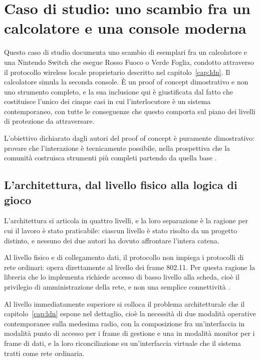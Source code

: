 
\chapter{Caso di studio: uno scambio fra un calcolatore e una console moderna}
\label{cap:ldn-trading}

Questo caso di studio documenta uno scambio di esemplari fra un calcolatore e una Nintendo Switch che esegue Rosso Fuoco o Verde Foglia, condotto attraverso il protocollo wireless locale proprietario descritto nel capitolo~\ref{cap:ldn}. Il calcolatore simula la seconda console. È un proof of concept dimostrativo e non uno strumento completo, e la sua inclusione qui è giustificata dal fatto che costituisce l'unico dei cinque casi in cui l'interlocutore è un sistema contemporaneo, con tutte le conseguenze che questo comporta sul piano dei livelli di protezione da attraversare.

L'obiettivo dichiarato dagli autori del proof of concept è puramente dimostrativo: provare che l'interazione è tecnicamente possibile, nella prospettiva che la comunità costruisca strumenti più completi partendo da quella base \cite{frlg-ldn-trade}.

\section{L'architettura, dal livello fisico alla logica di gioco}

L'architettura si articola in quattro livelli, e la loro separazione è la ragione per cui il lavoro è stato praticabile: ciascun livello è stato risolto da un progetto distinto, e nessuno dei due autori ha dovuto affrontare l'intera catena.

Al livello fisico e di collegamento dati, il protocollo non impiega i protocolli di rete ordinari: opera direttamente al livello dei frame 802.11. Per questa ragione la libreria che lo implementa richiede accesso di basso livello alla scheda, cioè il privilegio di amministrazione della rete, e non una semplice connettività \cite{kinnay-ldn}.

Al livello immediatamente superiore si colloca il problema architetturale che il capitolo~\ref{cap:ldn} espone nel dettaglio, cioè la necessità di due modalità operative contemporanee sulla medesima radio, con la composizione fra un'interfaccia in modalità punto di accesso per i frame di gestione e una in modalità monitor per i frame di dati, e la loro riconciliazione su un'interfaccia virtuale che il sistema tratti come rete ordinaria.

